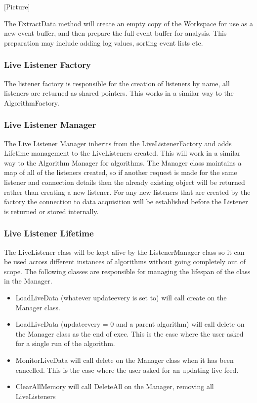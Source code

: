[Picture]

The ExtractData method will create an empty copy of the Workspace for use as a new event buffer, and then prepare the full event buffer for analysis.  This preparation may include adding log values, sorting event lists etc.

\subsubsection{Live Listener Factory} 
The listener factory is responsible for the creation of listeners by name, all listeners are returned as shared pointers.  This works in a similar way to the AlgorithmFactory.

\subsubsection{Live Listener Manager}
The Live Listener Manager inherits from the LiveListenerFactory and adds Lifetime management to the LiveListeners created.  This will work in a similar way to the Algorithm Manager for algorithms.  The Manager class maintains a map of all of the listeners created, so if another request is made for the same listener and connection details then the already existing object will be returned rather than creating a new listener.  For any new listeners that are created by the factory the connection to data acquisition will be established before the Listener is returned or stored internally.

\subsubsection{Live Listener Lifetime}
The LiveListener class will be kept alive by the ListenerManager class so it can be used across different instances of algorithms without going completely out of scope.  The following classes are responsible for managing the lifespan of the class in the Manager.
\begin{itemize}
\item LoadLiveData (whatever updateevery is set to) will call create on the Manager class.
\item LoadLiveData (updateevery = 0 and a parent algorithm) will call delete on the Manager class as the end of exec. This is the case where the user asked for a single run of the algorithm.
\item MonitorLiveData will call delete on the Manager class when it has been cancelled. This is the case where the user asked for an updating live feed.
\item ClearAllMemory will call DeleteAll on the Manager, removing all LiveListeners
\end{itemize}

